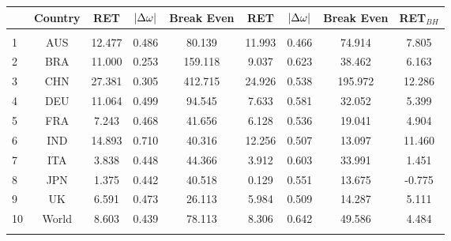 \begin{table}[!htbp]
\begin{adjustbox}{width=\textwidth}
\begin{tabular}{@{\extracolsep{5pt}} Hcccccccc}
	 \\
	& Country & RET & $\abs{\Delta\omega}$ & Break Even 
	& RET & $\abs{\Delta\omega}$ & Break Even & RET$_{BH}$ \\ 
	\hline \\[-1.8ex] 
	1 & AUS & 12.477 & 0.486 & 80.139 & 11.993 & 0.466 & 74.914 & 7.805 \\ 
	2 & BRA & 11.000 & 0.253 & 159.118 & 9.037 & 0.623 & 38.462 & 6.163 \\ 
	3 & CHN & 27.381 & 0.305 & 412.715 & 24.926 & 0.538 & 195.972 & 12.286 \\ 
	4 & DEU & 11.064 & 0.499 & 94.545 & 7.633 & 0.581 & 32.052 & 5.399 \\ 
	5 & FRA & 7.243 & 0.468 & 41.656 & 6.128 & 0.536 & 19.041 & 4.904 \\ 
	6 & IND & 14.893 & 0.710 & 40.316 & 12.256 & 0.507 & 13.097 & 11.460 \\ 
	7 & ITA & 3.838 & 0.448 & 44.366 & 3.912 & 0.603 & 33.991 & 1.451 \\ 
	8 & JPN & 1.375 & 0.442 & 40.518 & 0.129 & 0.551 & 13.675 & -0.775 \\ 
	9 & UK & 6.591 & 0.473 & 26.113 & 5.984 & 0.509 & 14.287 & 5.111 \\ 
	10 & World & 8.603 &  0.439  &   78.113&  8.306   &   0.642  &   49.586 & 4.484\\
	\hline \\[-1.8ex] 
\end{tabular} 
\end{adjustbox}
\end{table} 